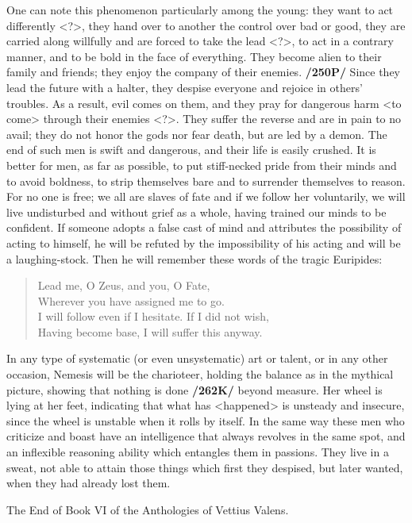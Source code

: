 One can note this phenomenon particularly among the young: they want to act differently <?>, they hand over to another the control over bad or good, they are carried along willfully and are forced to take the lead <?>, to act in a contrary manner, and to be bold in the face of everything. They become alien to their family and friends; they enjoy the company of their enemies. \textbf{/250P/} Since they lead the future with a halter, they despise everyone and rejoice in others’ troubles. As a result, evil comes on them, and they pray for dangerous harm <to come> through their enemies <?>. They suffer the reverse and are in pain to no avail; they do not honor the gods nor fear death, but are led by a demon. The end of such men is swift and
dangerous, and their life is easily crushed.  It is better for men, as far as possible, to put stiff-necked pride from their minds and to avoid boldness, to strip themselves bare and to surrender themselves to reason. For no one is free; we all are slaves of fate and if we follow her voluntarily, we will live undisturbed and without grief as a whole, having trained our minds to be confident. If someone adopts a false cast of mind and attributes the possibility of acting to himself, he will be refuted by the impossibility of his acting and will be a laughing-stock. Then he will remember these words of the tragic Euripides:

\begin{verse}
\small
Lead me, O Zeus, and you, O Fate, \\
Wherever you have assigned me to go.\\
I will follow even if I hesitate. If I did not wish, \\
Having become base, I will suffer this anyway. \\
\end{verse}

In any type of systematic (or even unsystematic) art or talent, or in any other occasion, Nemesis will be the charioteer, holding the balance as in the mythical picture, showing that nothing is done \textbf{/262K/}
beyond measure. Her wheel is lying at her feet, indicating that what has <happened> is unsteady and insecure, since the wheel is unstable when it rolls by itself. In the same way these men who criticize and boast have an intelligence that always revolves in the same spot, and an inflexible reasoning ability which entangles them in passions. They live in a sweat, not able to attain those things which first they despised, but later wanted, when they had already lost them.

The End of Book VI of the Anthologies of Vettius Valens.

\newpage